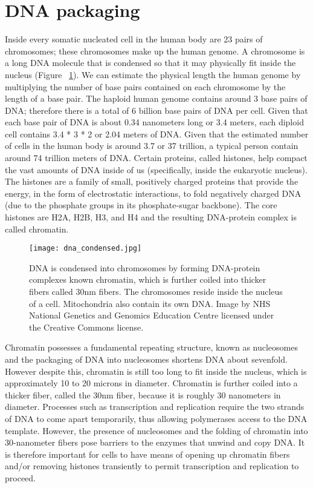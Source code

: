 \section{DNA packaging}

Inside every somatic nucleated cell in the human body are 23 pairs of chromosomes; these chromosomes make up the human genome. A chromosome is a long DNA molecule that is condensed so that it may physically fit inside the nucleus (Figure ~\ref{fig:dna_condensed}). We can estimate the physical length the human genome by multiplying the number of base pairs contained on each chromosome by the length of a base pair. The haploid human genome contains around 3 base pairs of DNA; therefore there is a total of 6 billion base pairs of DNA per cell. Given that each base pair of DNA is about 0.34 nanometers long or 3.4 meters\cite{pmid7354864}, each diploid cell contains 3.4 * 3 * 2 or 2.04 meters of DNA. Given that the estimated number of cells in the human body is around 3.7 or 37 trillion\cite{pmid23829164}, a typical person contain around 74 trillion meters of DNA. Certain proteins, called histones, help compact the vast amounts of DNA inside of us (specifically, inside the eukaryotic nucleus). The histones are a family of small, positively charged proteins that provide the energy, in the form of electrostatic interactions, to fold negatively charged DNA (due to the phosphate groups in its phosphate-sugar backbone). The core histones are H2A, H2B, H3, and H4 and the resulting DNA-protein complex is called chromatin.

\begin{figure}[!ht]
   \centering
   \texttt{[image: dna\_condensed.jpg]}
   \caption[Condensation of DNA]{DNA is condensed into chromosomes by forming DNA-protein complexes known chromatin, which is further coiled into thicker fibers called 30nm fibers. The chromosomes reside inside the nucleus of a cell. Mitochondria also contain its own DNA. Image by NHS National Genetics and Genomics Education Centre licensed under the Creative Commons license.}
   \label{fig:dna_condensed}
\end{figure}

Chromatin possesses a fundamental repeating structure\cite{holde01111974}, known as nucleosomes and the packaging of DNA into nucleosomes shortens DNA about sevenfold. However despite this, chromatin is still too long to fit inside the nucleus, which is approximately 10 to 20 microns in diameter. Chromatin is further coiled into a thicker fiber, called the 30nm fiber, because it is roughly 30 nanometers in diameter. Processes such as transcription and replication require the two strands of DNA to come apart temporarily, thus allowing polymerases access to the DNA template. However, the presence of nucleosomes and the folding of chromatin into 30-nanometer fibers pose barriers to the enzymes that unwind and copy DNA. It is therefore important for cells to have means of opening up chromatin fibers and/or removing histones transiently to permit transcription and replication to proceed.

